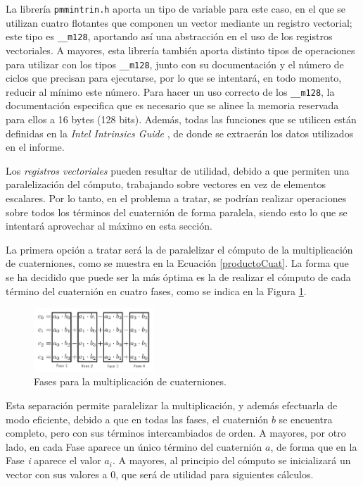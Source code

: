 \documentclass[conference]{IEEEtran}
\begin{document}
La librería \texttt{pmmintrin.h} aporta un tipo de variable para este caso, en el que se utilizan cuatro flotantes que componen un vector mediante un registro vectorial; este tipo es \texttt{\_\_m128}, aportando así una abstracción en el uso de los registros vectoriales. A mayores, esta librería también aporta distinto tipos de operaciones para utilizar con los tipos \texttt{\_\_m128}, junto con su documentación y el número de ciclos que precisan para ejecutarse, por lo que se intentará, en todo momento, reducir al mínimo este número. Para hacer un uso correcto de los \texttt{\_\_m128}, la documentación especifica que es necesario que se alinee la memoria reservada para ellos a 16 bytes (128 bits). Además, todas las funciones que se utilicen están definidas en la \textit{Intel Intrinsics Guide} \cite{intelIntrinsics}, de donde se extraerán los datos utilizados en el informe.

Los \textit{registros vectoriales} pueden resultar de utilidad, debido a que permiten una paralelización del cómputo, trabajando sobre vectores en vez de elementos escalares. Por lo tanto, en el problema a tratar, se podrían realizar operaciones sobre todos los términos del cuaternión de forma paralela, siendo esto lo que se intentará aprovechar al máximo en esta sección.

La primera opción a tratar será la de paralelizar el cómputo de la multiplicación de cuaterniones, como se muestra en la Ecuación \ref{productoCuat}. La forma que se ha decidido que puede ser la más óptima es la de realizar el cómputo de cada término del cuaternión en cuatro fases, como se indica en la Figura \ref{fasesMult}.

    \begin{figure}[htbp]
    \centering
    \includegraphics[width=0.4\textwidth]{fases.png}
        \caption{Fases para la multiplicación de cuaterniones.}
        \label{fasesMult}
    \end{figure}
    
Esta separación permite paralelizar la multiplicación, y además efectuarla de modo eficiente, debido a que en todas las fases, el cuaternión $b$ se encuentra completo, pero con sus términos intercambiados de orden. A mayores, por otro lado, en cada Fase aparece un único término del cuaternión $a$, de forma que en la Fase \textit{i} aparece el valor $a_{i}$. A mayores, al principio del cómputo se inicializará un vector con sus valores a 0, que será de utilidad para siguientes cálculos.
\end{document}
